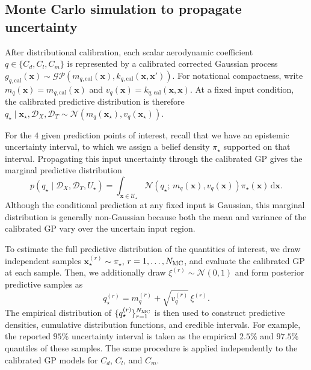 \documentclass[a4paper,12pt]{article}
\newcommand{\mcl}{\mathcal}
\newcommand{\x}{\mathbf{x}}
\begin{document}
\subsection{Monte Carlo simulation to propagate uncertainty}
After distributional calibration, each scalar aerodynamic coefficient
$q \in \{C_d,C_l,C_m\}$ is represented by a calibrated corrected Gaussian
process
$g_{q,\mathrm{cal}}(\mathbf{x}) \sim
\mathcal{GP}\!\left(m_{q,\mathrm{cal}}(\mathbf{x}),
k_{q,\mathrm{cal}}(\mathbf{x},\mathbf{x}')\right)$. For notational compactness, write
$m_q(\mathbf{x})=m_{q,\mathrm{cal}}(\mathbf{x})$ and
$v_q(\mathbf{x})=k_{q,\mathrm{cal}}(\mathbf{x},\mathbf{x})$. At a fixed input
condition, the calibrated predictive distribution is therefore
$q_\star \mid \mathbf{x}_\star,\mathcal{D}_X,\mathcal{D}_T
\sim \mathcal{N}\!\left(m_q(\mathbf{x}_\star),v_q(\mathbf{x}_\star)\right)$.

For the $4$ given prediction points of interest, recall that we have an epistemic uncertainty interval, to which we assign a belief density $\pi_\star$ supported on
that interval. Propagating this input uncertainty through the calibrated GP gives
the marginal predictive distribution
\[
p(q_\star \mid \mathcal{D}_X,\mathcal{D}_T,U_\star)
=
\int_{\x \in \mcl{U}_\star}
\mathcal{N}\!\left(q_\star;\,m_q(\mathbf{x}),v_q(\mathbf{x})\right)
\pi_\star(\mathbf{x})\,\mathrm{d}\mathbf{x}.
\]
Although the conditional prediction at any fixed input is Gaussian, this
marginal distribution is generally non-Gaussian because both the
mean and variance of the calibrated GP vary over the uncertain input region.

To estimate the full predictive distribution of the quantities of interest, we draw
independent samples $\mathbf{x}_\star^{(r)}\sim\pi_\star$, $r=1,\ldots,N_{\rm MC}$,
and evaluate the calibrated GP at each sample. Then,  we additionally draw $\xi^{(r)}\sim\mathcal{N}(0,1)$ and form
posterior predictive samples as
\[
q_\star^{(r)}
=
m_q^{(r)}+\sqrt{v_q^{(r)}}\,\xi^{(r)}.
\]
The empirical distribution of $\{q_\star^{(r)}\}_{r=1}^{N_{\rm MC}}$ is then
used to construct predictive densities, cumulative distribution functions, and
credible intervals. For example, the reported $95\%$ uncertainty interval is
taken as the empirical $2.5\%$ and $97.5\%$ quantiles of these samples. The same
procedure is applied independently to the calibrated GP models for $C_d$,
$C_l$, and $C_m$.
\end{document}
